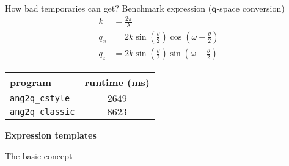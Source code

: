 \documentclass{beamer}
\begin{document}
\begin{frame}[fragile]{How bad temporaries can get?}
    Benchmark expression ($\mathbf{q}$-space conversion)
    \begin{align}
    k &= \frac{2\pi}{\lambda} \nonumber \\
        q_x &= 2k\sin\left(\frac{\theta}{2}\right)\cos\left(\omega-\frac{\theta}{2}\right)
        \nonumber \\
        q_z &= 2k\sin\left(\frac{\theta}{2}\right)\sin\left(\omega-\frac{\theta}{2}\right)
        \nonumber
    \end{align}

    \vspace{0.05\textheight}
    \begin{center}
        \begin{tabular}{lc}
            \hline
            program & runtime (ms) \\
            \hline\hline
            \texttt{ang2q\_cstyle} & $2649$ \\
            \texttt{ang2q\_classic} & $8623$  \\
            \hline
        \end{tabular}
    \end{center}

\end{frame}

\begin{frame}[plain]
    \begin{center}
        \huge\textbf{Expression templates}
    \end{center}
\end{frame}

\begin{frame}[fragile]{The basic concept}

\end{frame}


\end{document}
